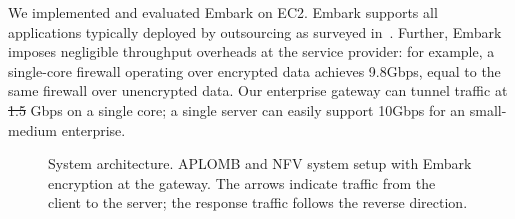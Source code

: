 \documentclass[letterpaper,twocolumn,10pt]{article}
\newcommand{\sys}{Embark\xspace} %
\providecommand{\DIFaddtex}[1]{{\protect\color{blue}\uwave{#1}}} %
\providecommand{\DIFdeltex}[1]{{\protect\color{red}\sout{#1}}}                      %
\providecommand{\DIFaddbegin}{} %
\providecommand{\DIFaddend}{} %
\providecommand{\DIFdelbegin}{} %
\providecommand{\DIFdelend}{} %
\providecommand{\DIFadd}[1]{\texorpdfstring{\DIFaddtex{#1}}{#1}} %
\providecommand{\DIFdel}[1]{\texorpdfstring{\DIFdeltex{#1}}{}} %
\begin{document}
\DIFaddend We implemented and evaluated \sys on EC2. \sys supports all applications typically deployed by outsourcing as surveyed in~\cite{aplomb}.
Further, \sys imposes  negligible throughput overheads at the service provider: for example, a single-core firewall operating over encrypted data achieves 9.8Gbps, equal to the same firewall over unencrypted data.
Our enterprise gateway can tunnel traffic at \DIFdelbegin \DIFdel{1.5 }\DIFdelend \DIFaddbegin \DIFadd{9.6 }\DIFaddend Gbps on a single core;  a single server can easily support 10Gbps for an small-medium enterprise.





\begin{figure}[t!]
\vspace{-10pt}
\centering
{}
%
\hfill  
{}

\caption{System architecture. APLOMB and NFV system setup with \sys encryption  at the gateway. The arrows indicate traffic from the client to the server; the response traffic follows the reverse direction. \label{fig:sys-overview}}
\end{figure}
\end{document}
